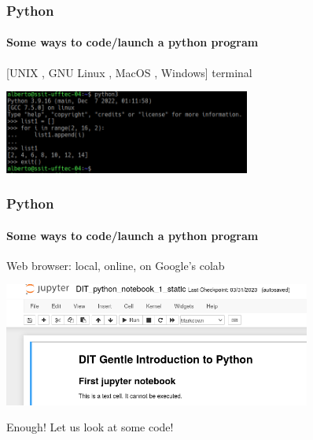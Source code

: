 \documentclass[xcolor=x11names,handout]{beamer}
\begin{document}
\begin{frame}
\frametitle{Python}
\framesubtitle{Some ways to code/launch a python program}

[UNIX , GNU Linux , MacOS , Windows] terminal

\begin{center}
 \includegraphics[width=81mm]{img/python_on_konsole.png}
\end{center}
\end{frame}

\begin{frame}
\frametitle{Python}
\framesubtitle{Some ways to code/launch a python program}

Web browser: local, online, on Google's colab

\begin{center}
 \includegraphics[width=101mm]{img/python_on_jupyter.png}
\end{center}
\end{frame}
 
% 
% 

\begin{frame}

\begin{center}
 \alert{Enough! Let us look at some code!}
\end{center}
\end{frame}
\end{document}
